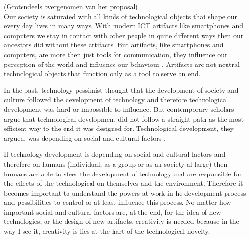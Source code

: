 (Grotendeels overgenomen van het proposal)\\

Our society is saturated with all kinds of technological objects that shape our every day lives in many ways. With modern ICT artifacts like smartphones and computers we stay in contact with other people in quite different ways then our ancestors did without these artifacts.  But artifacts, like smartphones and computers, are more then just tools for communication, they influence our perception of the world and influence our behaviour \cite{Verbeek2005,verbeek2011moralizing}. Artifacts are not neutral technological objects that function only as a tool to serve an end.

In the past, technology pessimist thought that the development of society and culture followed the development of technology and therefore technological development was hard or impossible to influence. 
But contemporary scholars argue that technological development did not follow a straight path as the most efficient way to the end it was designed for. Technological development, they argued, was depending on social and cultural factors \cite{Bijker1989}.

If technology development is depending on social and cultural factors and therefore on humans (individual, as a group or as an society al large) then humans are able to steer the development of technology and are responsible for the effects of the technological on themselves and the environment.  Therefore it becomes important to understand the powers at work in he development process and possibilities to control or at least influence this process.  
No matter how important social and cultural factors are, at the end, for the idea of new technologies, or the design  of new artifacts, creativity is needed because in the way I see it, creativity is lies at the hart of the technological novelty.

